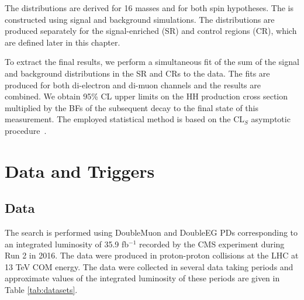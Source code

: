 The \mTHH distributions are derived for 16 masses and for both spin hypotheses. The \mTHH is constructed using signal and background simulations. The distributions are produced separately for the signal-enriched (SR) and control regions (CR), which are defined later in this chapter.

To extract the final results, we perform a simultaneous fit of the sum of the signal and background \mTHH distributions in the SR and CRs to the data. The fits are produced for both di-electron and di-muon channels and the results are combined. We obtain 95\% CL upper limits on the HH production cross section multiplied by the BFs of the subsequent decay to the final state of this measurement. The employed statistical method is based on the CL$_{S}$ asymptotic procedure~\cite{Zech:1988un}.

\section{Data and Triggers}
\label{sec:data_and_triggers}

\subsection{Data}
The search is performed using DoubleMuon and DoubleEG PDs corresponding to an integrated luminosity of 35.9 fb$^{-1}$ recorded by the CMS experiment during Run 2 in 2016. The data were produced in proton-proton collisions at the LHC at 13 TeV COM energy. The data were collected in several data taking periods and approximate values of the integrated luminosity of these periods are given in Table \ref{tab:datasets}.

